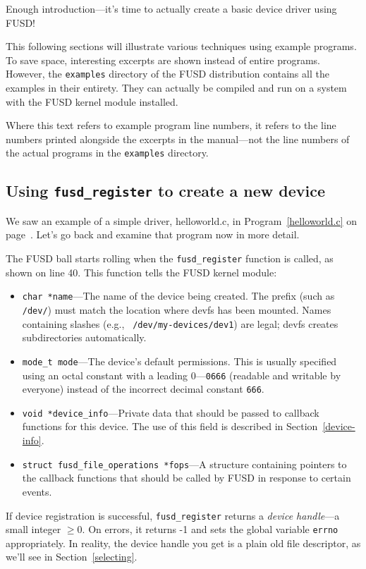 \documentclass{article}
\begin{document}
Enough introduction---it's time to actually create a basic device
driver using FUSD!

This following sections will illustrate various techniques using
example programs.  To save space, interesting excerpts are shown
instead of entire programs.  However, the {\tt examples} directory
of the FUSD distribution contains all the examples in their
entirety.  They can actually be compiled and run on a system with the
FUSD kernel module installed.

Where this text refers to example program line numbers, it refers to
the line numbers printed alongside the excerpts in the manual---not
the line numbers of the actual programs in the {\tt examples}
directory.


\subsection{Using {\tt fusd\_register} to create a new device}
\label{using-fusd-register}

We saw an example of a simple driver, helloworld.c, in
Program~\ref{helloworld.c} on page~\pageref{helloworld.c}.  Let's go
back and examine that program now in more detail.

The FUSD ball starts rolling when the {\tt fusd\_register} function is
called, as shown on line 40.  This function tells the FUSD kernel
module:
\begin{itemize}
\item {\tt char *name}---The name of the device being created.  The
prefix (such as {\tt /dev/}) must match the location where devfs has
been mounted.  Names containing slashes (e.g., {\tt
/dev/my-devices/dev1}) are legal; devfs creates subdirectories
automatically.
\item {\tt mode\_t mode}---The device's default permissions.  This is
usually specified using an octal constant with a leading 0---{\tt 0666}
(readable and writable by everyone) instead of the incorrect decimal
constant {\tt 666}.
\item {\tt void *device\_info}---Private data that should be passed to
callback functions for this device.  The use of this field is
described in Section~\ref{device-info}.
\item {\tt struct fusd\_file\_operations *fops}---A structure containing
pointers to the callback functions that should be called by FUSD
in response to certain events.
\end{itemize}

If device registration is successful, {\tt fusd\_register} returns a
{\em device handle}---a small integer $\ge0$.  On errors, it returns
-1 and sets the global variable {\tt errno} appropriately.  In
reality, the device handle you get is a plain old file descriptor,
as we'll see in Section~\ref{selecting}.
\end{document}
